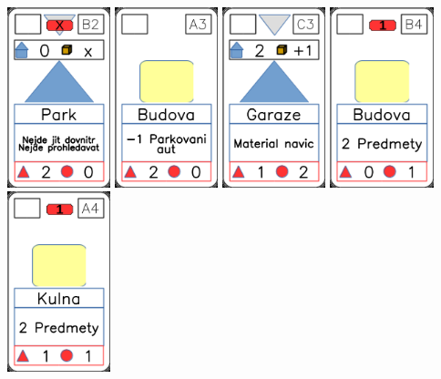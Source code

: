 \documentclass[a4paper]{article}
\begin{document}
	\includegraphics[width=3.0cm]{img-3_21}
	\includegraphics[width=3.0cm]{img-2_2}
	\includegraphics[width=3.0cm]{img-3_12}
	\includegraphics[width=3.0cm]{img-2_8}
	\includegraphics[width=3.0cm]{img-2_18}
\end{document}
